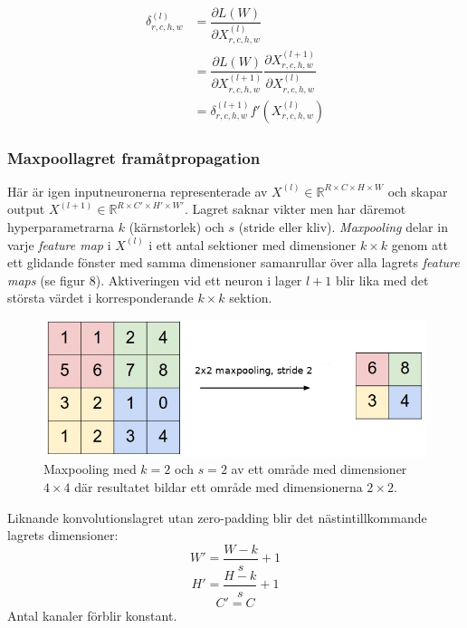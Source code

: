 \documentclass[a4paper,11pt,twoside]{article}
\newcommand*{\pd}[2]{\ensuremath{\dfrac{\partial #1}{\partial #2}}}
\begin{document}
\begin{equation}
\begin{split}
\delta^{(l)}_{r,c,h,w}
		& = \pd{L(W)}{X^{(l)}_{r,c,h,w}} \\
		& = \pd{L(W)}{X^{(l+1)}_{r,c,h,w}} \pd{X^{(l+1)}_{r,c,h,w}}{X^{(l)}_{r,c,h,w}} \\
		& = \delta^{(l+1)}_{r,c,h,w} f'(X^{(l)}_{r,c,h,w})
\end{split}
\end{equation}

\subsubsection{Maxpoollagret framåtpropagation}
Här är igen inputneuronerna representerade av $X^{(l)} \in \mathbb{R}^{R \times C \times H \times W}$ och skapar output $X^{(l+1)} \in \mathbb{R}^{R \times C' \times H' \times W'}$. Lagret saknar vikter men har däremot hyperparametrarna $k$ (kärnstorlek) och $s$ (stride eller kliv). \textit{Maxpooling} delar in varje \textit{feature map} i $X^{(l)}$ i ett antal sektioner med dimensioner $k \times k$ genom att ett glidande fönster med samma dimensioner samanrullar över alla lagrets \textit{feature maps} (se figur 8). Aktiveringen vid ett neuron i lager $l+1$ blir lika med det största värdet i korresponderande $k \times k$ sektion. \cite{cs231n} \cite{convmath} \cite{convarithmetic}

\begin{figure}[h]\label{figmaxpool}
	\centering
  		\includegraphics[scale=0.7]{maxpool.png}
  	\caption{Maxpooling med $k=2$ och $s=2$ av ett område med dimensioner $4 \times 4$ där resultatet bildar ett område med dimensionerna $2 \times 2$.}
\end{figure}

Liknande konvolutionslagret utan zero-padding blir det nästintillkommande lagrets dimensioner: \cite{cs231n} \cite{convmath} \cite{convarithmetic}
\begin{equation}
W' = \frac{W-k}{s}+1
\end{equation}
\begin{equation}
H' = \frac{H-k}{s}+1
\end{equation}
\begin{equation}
C' = C
\end{equation}
Antal kanaler förblir konstant. \cite{cs231n} \cite{convmath}
\end{document}
